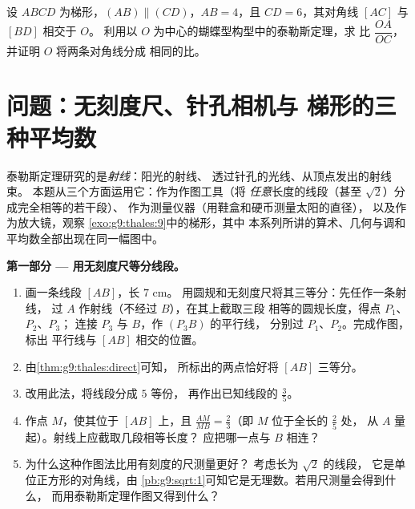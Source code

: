 \begin{exercise}[$\star\star\star$]\label{exo:g9:thales:9}
设 $ABCD$ 为梯形，$(AB) \parallel (CD)$，$AB = 4$，且
$CD = 6$，其对角线 $[AC]$ 与 $[BD]$ 相交于 $O$。
利用以 $O$ 为中心的蝴蝶型构型中的泰勒斯定理，求
比 $\dfrac{OA}{OC}$，并证明 $O$ 将两条对角线分成
相同的比。
\end{exercise}

\section{问题：无刻度尺、针孔相机与
梯形的三种平均数}

\begin{problem}
\label{pb:g9:thales:1}
泰勒斯定理研究的是\emph{射线}：阳光的射线、
透过针孔的光线、从顶点发出的射线束。
本题从三个方面运用它：作为作图工具（将
\emph{任意}长度的线段（甚至 $\sqrt2$）分成完全相等的若干段）、
作为测量仪器（用鞋盒和硬币测量太阳的直径），
以及作为放大镜，观察
\cref{exo:g9:thales:9}中的梯形，其中
本系列所讲的算术、几何与调和平均数全部出现在同一幅图中。

\medskip
\noindent\textbf{第一部分 --- 用无刻度尺等分线段。}
\begin{enumerate}
  \item 画一条线段 $[AB]$，长 $7$ cm。
        用圆规和无刻度尺将其三等分：先任作一条射线，
        过 $A$ 作射线（不经过 $B$），在其上截取三段
        相等的圆规长度，得点 $P_1$、$P_2$、$P_3$；
        连接 $P_3$ 与 $B$，作 $(P_3 B)$ 的平行线，
        分别过 $P_1$、$P_2$。完成作图，标出
        平行线与 $[AB]$ 相交的位置。
  \item 由\cref{thm:g9:thales:direct}可知，
        所标出的两点恰好将 $[AB]$ 三等分。
  \item 改用此法，将线段分成 $5$ 等份，
        再作出已知线段的 $\frac35$。
  \item 作点 $M$，使其位于 $[AB]$ 上，且
        $\frac{AM}{MB} = \frac23$（即 $M$ 位于全长的 $\frac25$ 处，
        从 $A$ 量起）。射线上应截取几段相等长度？
        应把哪一点与 $B$ 相连？
  \item 为什么这种作图法比用有刻度的尺测量更好？
        考虑长为 $\sqrt2$ 的线段，
        它是单位正方形的对角线，由
        \cref{pb:g9:sqrt:1}可知它是无理数。若用尺测量会得到什么，
        而用泰勒斯定理作图又得到什么？
\end{enumerate}


\end{problem}
